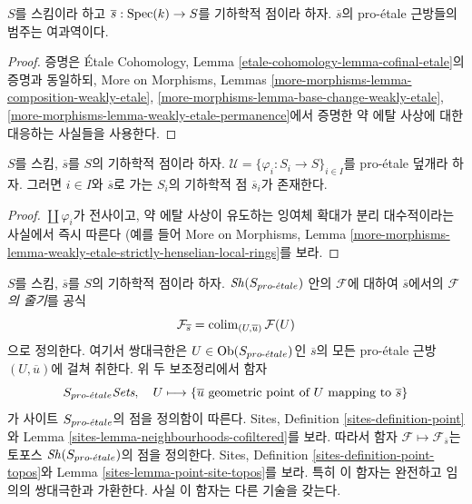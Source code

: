 \begin{lemma}
\label{lemma-cofinal-etale}
$S$를 스킴이라 하고 $\overline{s} : \mathop{\mathrm{Spec}}(k) \to S$를 기하학적 점이라
하자. $\overline{s}$의 pro-\'etale 근방들의 범주는 여과역이다.
\end{lemma}

\begin{proof}
증명은 \'Etale Cohomology, Lemma
\ref{etale-cohomology-lemma-cofinal-etale}의 증명과 동일하되,
More on Morphisms, Lemmas
\ref{more-morphisms-lemma-composition-weakly-etale},
\ref{more-morphisms-lemma-base-change-weakly-etale},
\ref{more-morphisms-lemma-weakly-etale-permanence}에서 증명한 약 에탈
사상에 대한 대응하는 사실들을 사용한다.
\end{proof}

\begin{lemma}
\label{lemma-geometric-lift-to-cover}
$S$를 스킴, $\overline{s}$를 $S$의 기하학적 점이라 하자.
$\mathcal{U} = \{\varphi_i : S_i \to S\}_{i\in I}$를 pro-\'etale
덮개라 하자. 그러면 $i \in I$와 $\overline{s}$로 가는 $S_i$의
기하학적 점 $\overline{s}_i$가 존재한다.
\end{lemma}

\begin{proof}
$\coprod \varphi_i$가 전사이고, 약 에탈 사상이 유도하는 잉여체 확대가
분리 대수적이라는 사실에서 즉시 따른다
(예를 들어 More on Morphisms, Lemma
\ref{more-morphisms-lemma-weakly-etale-strictly-henselian-local-rings}를 보라.
\end{proof}

\noindent
$S$를 스킴, $\overline{s}$를 $S$의 기하학적 점이라 하자.
$\mathop{\mathit{Sh}}\nolimits(S_{pro\text{-}\acute{e}tale})$ 안의 $\mathcal{F}$에 대하여 $\overline{s}$에서의
{\it $\mathcal{F}$의 줄기}를 공식
$$
\mathcal{F}_{\overline{s}} = \mathop{\mathrm{colim}}\nolimits_{(U, \overline{u})} \mathcal{F}(U)
$$
으로 정의한다. 여기서 쌍대극한은 $U \in \mathop{\mathrm{Ob}}\nolimits(S_{pro\text{-}\acute{e}tale})$인
$\overline{s}$의 모든 pro-\'etale 근방 $(U, \overline{u})$에 걸쳐
취한다. 위 두 보조정리에서 함자
$$
S_{pro\text{-}\acute{e}tale} \textit{Sets},\quad
U \longmapsto
\{\overline{u}\text{ geometric point of }U\text{ mapping to }\overline{s}\}
$$
가 사이트 $S_{pro\text{-}\acute{e}tale}$의 점을 정의함이 따른다. Sites, Definition
\ref{sites-definition-point}와 Lemma
\ref{sites-lemma-neighbourhoods-cofiltered}를 보라. 따라서 함자
$\mathcal{F} \mapsto \mathcal{F}_{\overline{s}}$는 토포스
$\mathop{\mathit{Sh}}\nolimits(S_{pro\text{-}\acute{e}tale})$의 점을 정의한다. Sites, Definition
\ref{sites-definition-point-topos}와 Lemma
\ref{sites-lemma-point-site-topos}를 보라. 특히 이 함자는 완전하고
임의의 쌍대극한과 가환한다. 사실 이 함자는 다른 기술을 갖는다.


